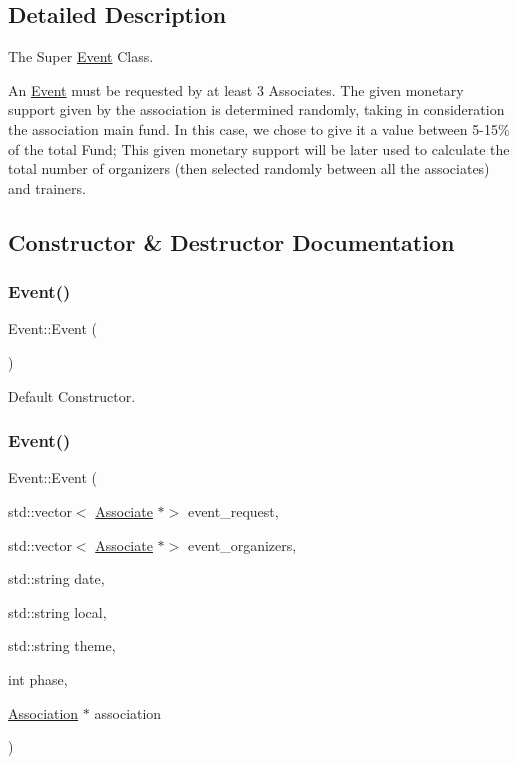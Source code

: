 \subsection{Detailed Description}
The Super \mbox{\hyperlink{classEvent}{Event}} Class. 

An \mbox{\hyperlink{classEvent}{Event}} must be requested by at least 3 Associates. The given monetary support given by the association is determined randomly, taking in consideration the association main fund. In this case, we chose to give it a value between 5-\/15\% of the total Fund; This given monetary support will be later used to calculate the total number of organizers (then selected randomly between all the associates) and trainers. 

\subsection{Constructor \& Destructor Documentation}
\mbox{\label{classEvent_a5a40dd4708297f7031e29b39e039ae10}} 
\subsubsection{\texorpdfstring{Event()}{Event()}\hspace{0.1cm}{\footnotesize\ttfamily [1/2]}}
{\footnotesize\ttfamily Event\+::\+Event (\begin{DoxyParamCaption}{ }\end{DoxyParamCaption})}



Default Constructor. 

\mbox{\label{classEvent_a2fb2bff37e364023fe54d0f86e49e696}} 
\subsubsection{\texorpdfstring{Event()}{Event()}\hspace{0.1cm}{\footnotesize\ttfamily [2/2]}}
{\footnotesize\ttfamily Event\+::\+Event (\begin{DoxyParamCaption}\item[{std\+::vector$<$ \mbox{\hyperlink{classAssociate}{Associate}} $\ast$$>$}]{event\+\_\+request,  }\item[{std\+::vector$<$ \mbox{\hyperlink{classAssociate}{Associate}} $\ast$$>$}]{event\+\_\+organizers,  }\item[{std\+::string}]{date,  }\item[{std\+::string}]{local,  }\item[{std\+::string}]{theme,  }\item[{int}]{phase,  }\item[{\mbox{\hyperlink{classAssociation}{Association}} $\ast$}]{association }\end{DoxyParamCaption})}



